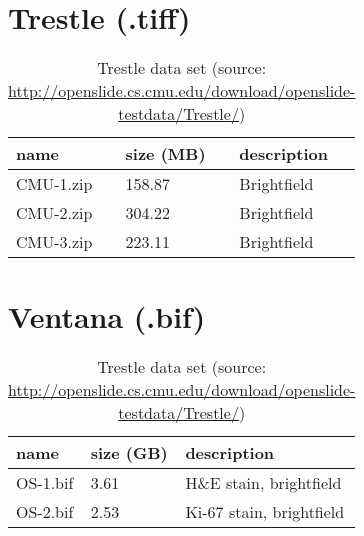 \section{Trestle (.tiff)}

\begin{table}[H]
	\begin{center}
		\begin{tabular}{| p{4cm} | p{2cm} | p{5cm} |}
			\hline
			\textbf{name} & \textbf{size (MB)} & \textbf{description} \\ \hline
			 CMU-1.zip & 158.87 & Brightfield \\ \hline
			 CMU-2.zip & 304.22 & Brightfield \\ \hline
			 CMU-3.zip & 223.11 & Brightfield \\ \hline
		\end{tabular}
		\caption{Trestle data set (source: \url{http://openslide.cs.cmu.edu/download/openslide-testdata/Trestle/})}
	\end{center}
\end{table}


\section{Ventana (.bif)}
\label{sec_A8}
\begin{table}[H]
	\begin{center}
		\begin{tabular}{| p{4cm} | p{2cm} | p{5cm} |}
			\hline
			\textbf{name} & \textbf{size (GB)} & \textbf{description} \\ \hline
			 OS-1.bif & 3.61 & H\&E stain, brightfield \\ \hline
			 OS-2.bif & 2.53 & Ki-67 stain, brightfield \\ \hline
 		\end{tabular}
		\caption{Trestle data set (source: \url{http://openslide.cs.cmu.edu/download/openslide-testdata/Trestle/})}
	\end{center}
\end{table}